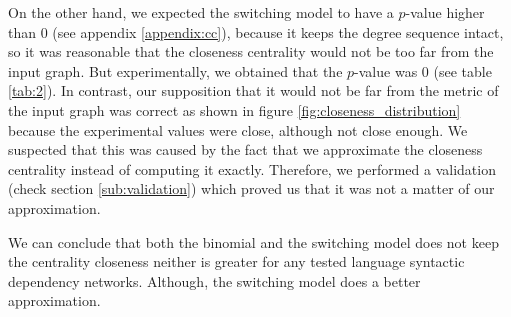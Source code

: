 On the other hand, we expected the switching model to have a $p$-value higher than 0 (see appendix \ref{appendix:cc}), because it keeps the degree sequence intact, so it was reasonable that the closeness centrality would not be too far from the input graph. But experimentally, we obtained that the $p$-value was 0 (see table \ref{tab:2}). In contrast, our supposition that it would not be far from the metric of the input graph was correct as shown in figure \ref{fig:closeness_distribution} because the experimental values were close, although not close enough. We suspected that this was caused by the fact that we approximate the closeness centrality instead of computing it exactly. Therefore, we performed a validation (check section \ref{sub:validation}) which proved us that it was not a matter of our approximation. 

We can conclude that both the binomial and the switching model does not keep the centrality closeness neither is greater for any tested language syntactic dependency networks. Although, the switching model does a better approximation.